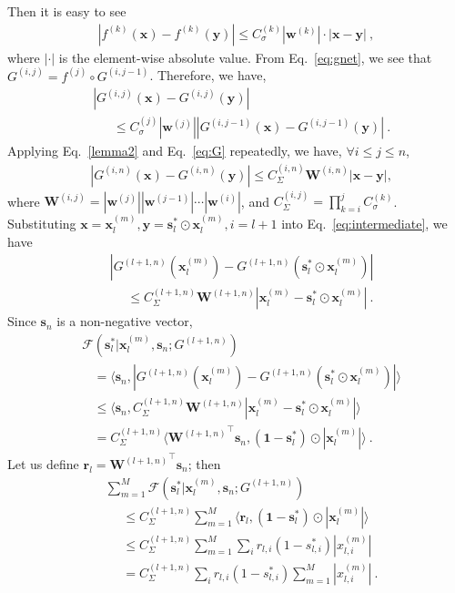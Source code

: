 \documentclass[10pt,twocolumn,letterpaper]{article}
\def\mb{\mathbf}
\begin{document}
Then it is easy to see
\begin{align}\label{lemma2}
|f^{(k)}(\mb x)-f^{(k)}(\mb y)|\le C_\sigma^{(k)}|\mb w^{(k)}|\cdot|\mb x-\mb y|~,
\end{align}
where $|\cdot|$ is the element-wise absolute value. From Eq.~\ref{eq:gnet}, we see that $G^{(i,j)}=f^{(j)}\circ G^{(i,j-1)}$. Therefore, we have,
\begin{align}
    &|G^{(i,j)}(\mb x)-G^{(i,j)}(\mb y)|\nonumber\\
    &~~~~~~~\le C_\sigma^{(j)}|\mb w^{(j)}||G^{(i,j-1)}(\mb x)-G^{(i,j-1)}(\mb y)|~.\label{eq:G}
\end{align}
Applying Eq.~\ref{lemma2} and Eq.~\ref{eq:G} repeatedly, we have, $\forall i\le j\le n$,
\begin{align}
   & |G^{(i,n)}(\mb x)-G^{(i,n)}(\mb y)|\le C_\Sigma^{(i,n)}\mb W^{(i,n)}|\mb x-\mb y|,\label{eq:intermediate}
\end{align}
where $\mb W^{(i,j)}=|\mb w^{(j)}||\mb w^{(j-1)}|\cdots|\mb w^{(i)}|$, and  $C_\Sigma^{(i,j)}=\prod_{k=i}^j C_\sigma^{(k)}$.
Substituting $\mb x = \mb x_l^{(m)},\mb y=\mb s^*_l\odot\mb x_l^{(m)},i=l+1$ into Eq.~\ref{eq:intermediate}, we have
\begin{align}
&|G^{(l+1,n)}(\mb x^{(m)}_l)-G^{(l+1,n)}(\mb s^*_l\odot\mb x^{(m)}_l)|\nonumber\\
&~~~~~~\le C_\Sigma^{(l+1,n)}\mb W^{(l+1,n)}|\mb x^{(m)}_l-\mb s^*_l\odot\mb x^{(m)}_l|~.
\end{align}
Since $\mb s_n$ is a non-negative vector,
\begin{align}
&\mathcal{F}(\mb s^*_l|\mb x^{(m)}_l,\mb s_n; G^{(l+1,n)})\nonumber\\
&~~~~=\langle\mb s_n, |G^{(l+1,n)}(\mb x^{(m)}_l)-G^{(l+1,n)}(\mb s^*_l\odot\mb x^{(m)}_l)|\rangle\\
&~~~~\le \langle\mb s_n, C_\Sigma^{(l+1,n)}\mb W^{(l+1,n)}|\mb x^{(m)}_l-\mb s^*_l\odot\mb x^{(m)}_l|\rangle\\
&~~~~=C_\Sigma^{(l+1,n)}\langle{\mb W^{(l+1,n)}}^\intercal\mb s_n, (\mb 1-\mb s^*_l)\odot  |\mb{x}^{(m)}_l|\rangle~.
\end{align}
Let us define $\mb r_l={\mb W^{(l+1,n)}}^\intercal\mb s_n$; then
\begin{align}
&\textstyle\sum_{m=1}^M \mathcal{F}(\mb s^*_l|\mb x^{(m)}_l,\mb s_n; G^{(l+1,n)})\nonumber\\
&\textstyle~~~~~~\le C_\Sigma^{(l+1,n)}\sum_{m=1}^M \langle\mb r_l,(\mb 1-\mb s^*_l)\odot|\mb x^{(m)}_l|\rangle\\
&\textstyle~~~~~~\le C_\Sigma^{(l+1,n)}\sum_{m=1}^M \sum_i r_{l,i}(1-s^*_{l,i})|x^{(m)}_{l,i}|\\
&\textstyle~~~~~~=C_\Sigma^{(l+1,n)}\sum_ir_{l,i}(1-s^*_{l,i})\sum_{m=1}^M|x^{(m)}_{l,i}|~.
\end{align}
\end{document}
